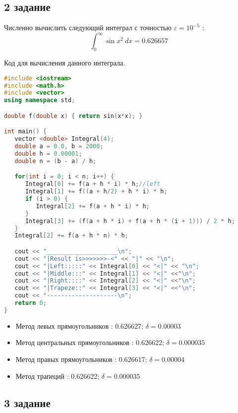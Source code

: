 \documentclass[14pt, a4paper, titlepage, fleqn]{extarticle}
\begin{document}
    \subsection*{2 задание}
    Численно вычислить следующий интеграл с точностью $\varepsilon  = 10^{-5}$ :
    \[\int_{0}^{\infty} {\sin{x^2}} ~ dx = 0.626657\]
    
    \pagebreak
    Код для вычисления данного интеграла.
    \begin{lstlisting}[language=C++, basicstyle=\footnotesize\ttfamily, frame=single]
#include <iostream>
#include <math.h>
#include <vector>
using namespace std;

double f(double x) { return sin(x*x); }

int main() {
   vector <double> Integral(4);
   double a = 0.0, b = 2000;
   double h = 0.00001;
   double n = (b - a) / h;

   for(int i = 0; i < n; i++) {
      Integral[0] += f(a + h * i) * h;//left
      Integral[1] += f((a + h/2) + h * i) * h;
      if (i > 0) {
         Integral[2] += f(a + h * i) * h;
      }
      Integral[3] += (f(a + h * i) + f(a + h * (i + 1))) / 2 * h;
   }
   Integral[2] += f(a + h * n) * h;

   cout << "____________________\n";
   cout << "|Result is>>>>>>>-<" << "|" << "\n";
   cout << "|Left:::::" << Integral[0] << "<|" << "\n";
   cout << "|Middle:::" << Integral[1] << "<|" <<"\n";
   cout << "|Right::::" << Integral[2] << "<|" <<"\n";
   cout << "|Trapeze::" << Integral[3] << "<|" <<"\n";
   cout << "--------------------\n";
   return 0;
}
    \end{lstlisting}
    
    \begin{itemize}
    
    	\item Метод левых прямоугольников : 0.626627; $\delta = 0.00003$
    	\item Метод центральных прямоугольников : 0.626622; $\delta = 0.000035$
    	\item Метод правых прямоугольников : 0.626617;  $\delta = 0.00004$
    	\item Метод трапеций : 0.626622;  $\delta = 0.000035$
    	
    \end{itemize}
    
        \subsection*{3 задание}
    
\end{document}
